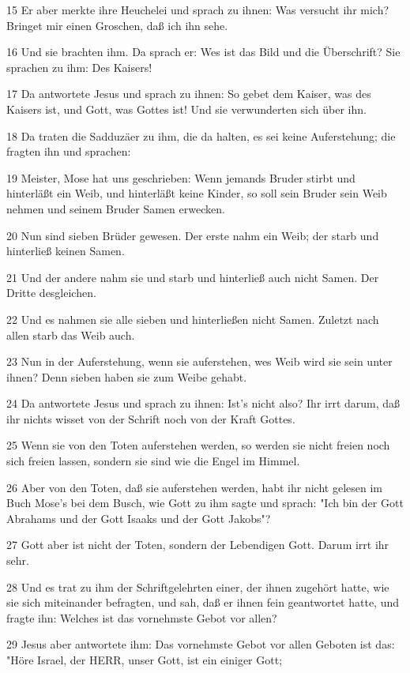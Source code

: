 \par 15 Er aber merkte ihre Heuchelei und sprach zu ihnen: Was versucht ihr mich? Bringet mir einen Groschen, daß ich ihn sehe.
\par 16 Und sie brachten ihm. Da sprach er: Wes ist das Bild und die Überschrift? Sie sprachen zu ihm: Des Kaisers!
\par 17 Da antwortete Jesus und sprach zu ihnen: So gebet dem Kaiser, was des Kaisers ist, und Gott, was Gottes ist! Und sie verwunderten sich über ihn.
\par 18 Da traten die Sadduzäer zu ihm, die da halten, es sei keine Auferstehung; die fragten ihn und sprachen:
\par 19 Meister, Mose hat uns geschrieben: Wenn jemands Bruder stirbt und hinterläßt ein Weib, und hinterläßt keine Kinder, so soll sein Bruder sein Weib nehmen und seinem Bruder Samen erwecken.
\par 20 Nun sind sieben Brüder gewesen. Der erste nahm ein Weib; der starb und hinterließ keinen Samen.
\par 21 Und der andere nahm sie und starb und hinterließ auch nicht Samen. Der Dritte desgleichen.
\par 22 Und es nahmen sie alle sieben und hinterließen nicht Samen. Zuletzt nach allen starb das Weib auch.
\par 23 Nun in der Auferstehung, wenn sie auferstehen, wes Weib wird sie sein unter ihnen? Denn sieben haben sie zum Weibe gehabt.
\par 24 Da antwortete Jesus und sprach zu ihnen: Ist's nicht also? Ihr irrt darum, daß ihr nichts wisset von der Schrift noch von der Kraft Gottes.
\par 25 Wenn sie von den Toten auferstehen werden, so werden sie nicht freien noch sich freien lassen, sondern sie sind wie die Engel im Himmel.
\par 26 Aber von den Toten, daß sie auferstehen werden, habt ihr nicht gelesen im Buch Mose's bei dem Busch, wie Gott zu ihm sagte und sprach: "Ich bin der Gott Abrahams und der Gott Isaaks und der Gott Jakobs"?
\par 27 Gott aber ist nicht der Toten, sondern der Lebendigen Gott. Darum irrt ihr sehr.
\par 28 Und es trat zu ihm der Schriftgelehrten einer, der ihnen zugehört hatte, wie sie sich miteinander befragten, und sah, daß er ihnen fein geantwortet hatte, und fragte ihn: Welches ist das vornehmste Gebot vor allen?
\par 29 Jesus aber antwortete ihm: Das vornehmste Gebot vor allen Geboten ist das: "Höre Israel, der HERR, unser Gott, ist ein einiger Gott;
